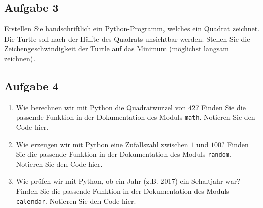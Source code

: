 \subsection{Aufgabe 3}

Erstellen Sie handschriftlich ein Python-Programm, welches ein Quadrat zeichnet. Die Turtle soll nach der Hälfte des Quadrats unsichtbar werden. Stellen Sie die Zeichengeschwindigkeit der Turtle auf das Minimum (möglichst langsam zeichnen).


\newpage

\subsection{Aufgabe 4}

\begin{enumerate}
	\item Wie berechnen wir mit Python die Quadratwurzel von $42$? Finden Sie die passende Funktion in der Dokumentation des Moduls \lstinline{math}. Notieren Sie den Code hier.
	\fillwithgrid{1.5in}
	\item Wie erzeugen wir mit Python eine Zufallszahl zwischen $1$ und $100$? Finden Sie die passende Funktion in der Dokumentation des Moduls \lstinline{random}. Notieren Sie den Code hier.
	\fillwithgrid{1.5in}
		\item Wie prüfen wir mit Python, ob ein Jahr (z.B. 2017) ein Schaltjahr war? Finden Sie die passende Funktion in der Dokumentation des Moduls \lstinline{calendar}. Notieren Sie den Code hier.
	\fillwithgrid{1.5in}
\end{enumerate}
